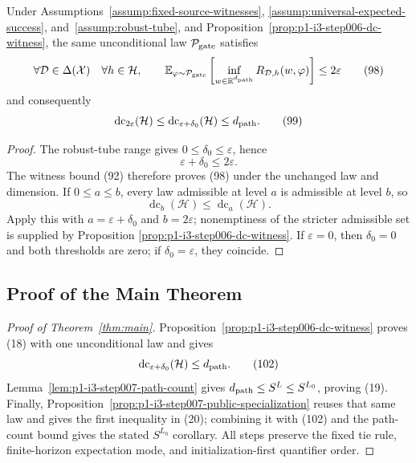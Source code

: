 \begin{proposition}
\label{prop:p1-i3-step007-public-specialization}
Under Assumptions~\ref{assump:fixed-source-witnesses},
\ref{assump:universal-expected-success}, and~\ref{assump:robust-tube}, and
Proposition~\ref{prop:p1-i3-step006-dc-witness}, the same unconditional law
$\mathcal P_{\rm gate}$ satisfies
\[
\forall\mathcal D\in\Delta(\mathcal X)\quad
\forall h\in\mathcal H,
\qquad
\mathbb E_{\varphi\sim\mathcal P_{\rm gate}}
\left[\inf_{w\in\mathbb R^{d_{\rm path}}}
R_{\mathcal D,h}(w,\varphi)\right]\leq2\varepsilon
\tag{98}
\]
and consequently
\[
\operatorname{dc}_{2\varepsilon}(\mathcal H)
\leq\operatorname{dc}_{\varepsilon+\delta_0}(\mathcal H)
\leq d_{\rm path}.
\tag{99}
\]
\end{proposition}

\begin{proof}
The robust-tube range gives $0\leq\delta_0\leq\varepsilon$, hence
\[
\varepsilon+\delta_0\leq2\varepsilon.
\tag{100}
\]
The witness bound (92) therefore proves (98) under the unchanged law and
dimension.  If $0\leq a\leq b$, every law admissible at level $a$ is
admissible at level $b$, so
\[
\operatorname{dc}_b(\mathcal H)\leq\operatorname{dc}_a(\mathcal H).
\tag{101}
\]
Apply this with $a=\varepsilon+\delta_0$ and $b=2\varepsilon$; nonemptiness
of the stricter admissible set is supplied by Proposition
\ref{prop:p1-i3-step006-dc-witness}.  If $\varepsilon=0$, then $\delta_0=0$
and both thresholds are zero; if $\delta_0=\varepsilon$, they coincide.
\end{proof}

\subsection{Proof of the Main Theorem}
\label{app:main-proof}

\begin{proof}[Proof of Theorem~\ref{thm:main}]
Proposition~\ref{prop:p1-i3-step006-dc-witness} proves (18) with one
unconditional law and gives
\[
\operatorname{dc}_{\varepsilon+\delta_0}(\mathcal H)
\leq d_{\rm path}.
\tag{102}
\]
Lemma~\ref{lem:p1-i3-step007-path-count} gives
$d_{\rm path}\leq S^L\leq S^{L_0}$, proving (19).  Finally,
Proposition~\ref{prop:p1-i3-step007-public-specialization} reuses that same
law and gives the first inequality in (20); combining it with (102) and the
path-count bound gives the stated $S^{L_0}$ corollary.  All steps preserve the
fixed tie rule, finite-horizon expectation mode, and initialization-first
quantifier order.
\end{proof}
